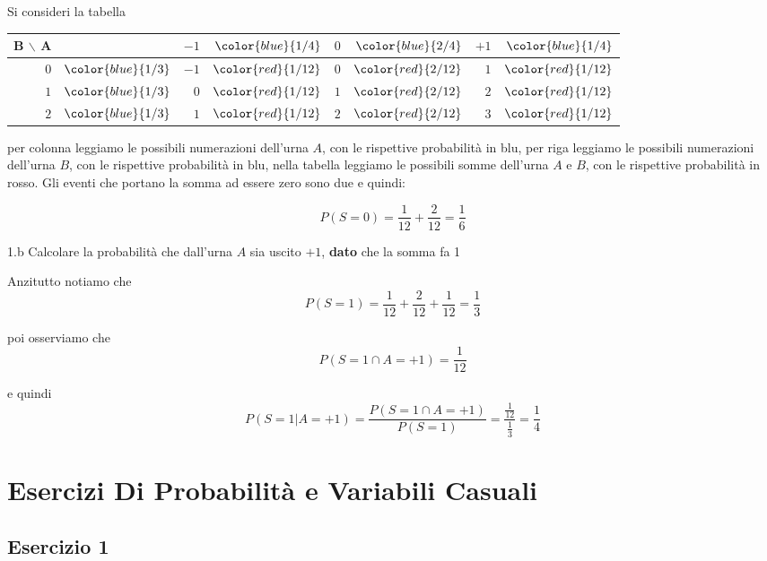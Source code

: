 \documentclass[
  11pt,
]{book}
\theoremstyle{mytheoremstyle}
\theoremstyle{mydefstyle}
\newenvironment{sol}
  {
  \begin{tcolorbox}[enhanced,breakable,arc=0.1mm,boxrule=1pt,colback=white,colframe=iblue,
  title=\bf \fontfamily{lmss}\selectfont \hspace{.5 cm} Soluzione,drop fuzzy shadow]

}{
\end{tcolorbox}
  }
\begin{document}
\begin{sol}
Si consideri la tabella

\begin{tabular}{r>{}r|rrrrrr}
\toprule
B $\backslash$ A &  & $-1$ & $\color{blue}{1/4}$ & $0$ & $\color{blue}{2/4}$ & $+1$ & $\color{blue}{1/4}$\\
\midrule
$0$ & $\color{blue}{1/3}$ & $-1$ & $\color{red}{1/{12}}$ & $0$ & $\color{red}{2/{12}}$ & $1$ & $\color{red}{1/{12}}$\\
$1$ & $\color{blue}{1/3}$ & $0$ & $\color{red}{1/{12}}$ & $1$ & $\color{red}{2/{12}}$ & $2$ & $\color{red}{1/{12}}$\\
$2$ & $\color{blue}{1/3}$ & $1$ & $\color{red}{1/{12}}$ & $2$ & $\color{red}{2/{12}}$ & $3$ & $\color{red}{1/{12}}$\\
\bottomrule
\end{tabular}

per colonna leggiamo le possibili numerazioni dell'urna \(A\), con le rispettive probabilità in blu,
per riga leggiamo le possibili numerazioni dell'urna \(B\), con le rispettive probabilità in blu,
nella tabella leggiamo le possibili somme dell'urna \(A\) e \(B\), con le rispettive probabilità in rosso.
Gli eventi che portano la somma ad essere zero sono due e quindi:

\[
P(S=0)=\frac 1{12}+\frac 2{12}=\frac 16
\]

\end{sol}

1.b Calcolare la probabilità che dall'urna \(A\) sia uscito \(\mbox{+1}\), \textbf{dato} che
la somma fa 1

\begin{sol}
Anzitutto notiamo che
\[
P(S=1)=\frac1{12}+\frac2{12}+\frac1{12}=\frac13
\]

poi osserviamo che
\[
P(S=1\cap A=\mbox{+1})=\frac1{12}
\]

e quindi
\[
P(S=1|A=\mbox{+1})=\frac{P(S=1\cap A=\mbox{+1})}{P(S=1)}=\frac{\frac{1}{12}}{\frac13}=\frac14
\]

\end{sol}

\chapter{Esercizi Di Probabilità e Variabili Casuali}\label{esercizi-di-probabilituxe0-e-variabili-casuali}

\section{Esercizio 1}\label{esercizio-1}
\end{document}
